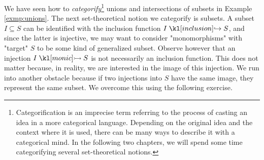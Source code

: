 \documentclass[main.tex]{subfiles}
\begin{document}
We have seen how to \textit{categorify}\footnote{Categorification is an imprecise term referring to the process of casting an idea in a more categorical language. Depending on the original idea and the context where it is used, there can be many ways to describe it with a categorical mind. In the following two chapters, we will spend some time categorifying several set-theoretical notions.} unions and intersections of subsets in Example \ref{exmp:unions}. The next set-theoretical notion we categorify is subsets. A subset $I \subseteq S$ can be identified with the inclusion function $I \inclusion S$, and since the latter is injective, we may want to consider "monomorphisms" with "target" $S$ to be some kind of generalized subset. Observe however that an injection $I \mono S$ is not necessarily an inclusion function. This does not matter because, in reality, we are interested in the image of this injection. We run into another obstacle because if two injections into $S$ have the same image, they represent the same subset. We overcome this using the following exercise.
\end{document}
